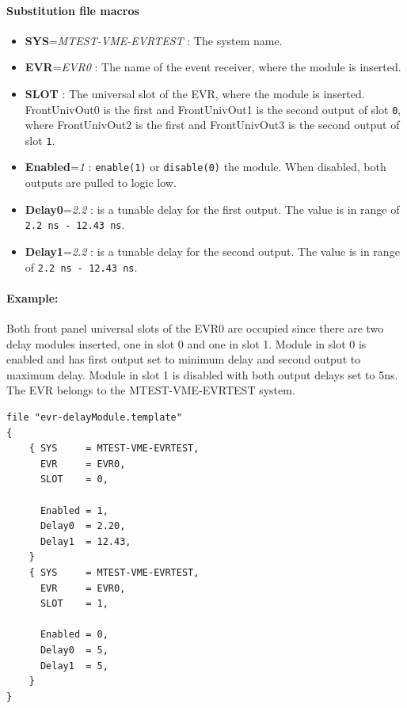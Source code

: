 \documentclass[12pt,a4paper]{article}
\begin{document}

\paragraph{Substitution file macros}
\begin{itemize}
\item
	\textbf{SYS}=\emph{MTEST-VME-EVRTEST} : The system name.
\item
	\textbf{EVR}=\emph{EVR0} : The name of the event receiver, where the module is inserted.
\item
  \textbf{SLOT} : The universal slot of the EVR, where the module is inserted. FrontUnivOut0 is the first and FrontUnivOut1 is the second output of slot \texttt{0}, where FrontUnivOut2 is the first and FrontUnivOut3 is the second output of slot \texttt{1}.
\item
  \textbf{Enabled}=\emph{1} : \texttt{enable(1)} or \texttt{disable(0)} the module.
  When disabled, both outputs are pulled to logic low.
\item
  \textbf{Delay0}=\emph{2.2} : is a tunable delay for the first output. The value is
  in range of \texttt{2.2 ns - 12.43 ns}.
\item
  \textbf{Delay1}=\emph{2.2} : is a tunable delay for the second output. The value
  is in range of \texttt{2.2 ns - 12.43 ns}.
\end{itemize}

\paragraph{Example:} Both front panel universal slots of the EVR0 are occupied since there are
two delay modules inserted, one in slot 0 and one in slot 1. Module in
slot 0 is enabled and has first output set to minimum delay and second
output to maximum delay. Module in slot 1 is disabled with both output
delays set to 5ns. The EVR belongs to the MTEST-VME-EVRTEST system.

\begin{verbatim}
file "evr-delayModule.template"
{
    { SYS     = MTEST-VME-EVRTEST,
      EVR     = EVR0,
      SLOT    = 0,

      Enabled = 1,
      Delay0  = 2.20,
      Delay1  = 12.43,
    }
    { SYS     = MTEST-VME-EVRTEST,
      EVR     = EVR0,
      SLOT    = 1,

      Enabled = 0,
      Delay0  = 5,
      Delay1  = 5,
    }
}
\end{verbatim}
\end{document}
